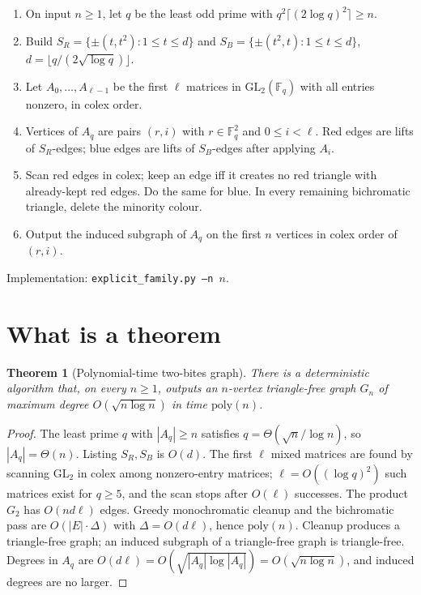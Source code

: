 \documentclass[11pt]{article}
\newtheorem{theorem}{Theorem}
\theoremstyle{definition}
\newcommand{\F}{\mathbb{F}}
\begin{document}
\begin{enumerate}
  \item On input $n\ge 1$, let $q$ be the least odd prime with
        $q^{2}\lceil(2\log q)^{2}\rceil\ge n$.
  \item Build $S_R=\{\pm(t,t^{2}):1\le t\le d\}$ and
        $S_B=\{\pm(t^{2},t):1\le t\le d\}$,
        $d=\lfloor q/(2\sqrt{\log q})\rfloor$.
  \item Let $A_0,\dots,A_{\ell-1}$ be the first $\ell$ matrices in
        $\mathrm{GL}_2(\F_q)$ with all entries nonzero, in colex order.
  \item Vertices of $A_q$ are pairs $(r,i)$ with $r\in\F_q^{2}$ and
        $0\le i<\ell$.
        Red edges are lifts of $S_R$-edges; blue edges are lifts of $S_B$-edges
        after applying $A_i$.
  \item Scan red edges in colex; keep an edge iff it creates no red triangle
        with already-kept red edges. Do the same for blue.
        In every remaining bichromatic triangle, delete the minority colour.
  \item Output the induced subgraph of $A_q$ on the first $n$ vertices in colex
        order of $(r,i)$.
\end{enumerate}

Implementation: \texttt{explicit\_family.py --n $n$}.

\section{What is a theorem}

\begin{theorem}[Polynomial-time two-bites graph]\label{thm:algo}
There is a deterministic algorithm that, on every $n\ge 1$, outputs an
$n$-vertex triangle-free graph $G_n$ of maximum degree
$O(\sqrt{n\log n})$ in time $\mathrm{poly}(n)$.
\end{theorem}

\begin{proof}
The least prime $q$ with $|A_q|\ge n$ satisfies $q=\Theta(\sqrt{n}/\log n)$,
so $|A_q|=\Theta(n)$.
Listing $S_R,S_B$ is $O(d)$.
The first $\ell$ mixed matrices are found by scanning
$\mathrm{GL}_2$ in colex among nonzero-entry matrices; $\ell=O((\log q)^{2})$
such matrices exist for $q\ge 5$, and the scan stops after $O(\ell)$ successes.
The product $G_2$ has $O(nd\ell)$ edges.
Greedy monochromatic cleanup and the bichromatic pass are $O(|E|\cdot\Delta)$
with $\Delta=O(d\ell)$, hence $\mathrm{poly}(n)$.
Cleanup produces a triangle-free graph; an induced subgraph of a triangle-free
graph is triangle-free.
Degrees in $A_q$ are $O(d\ell)=O(\sqrt{|A_q|\log |A_q|})=O(\sqrt{n\log n})$,
and induced degrees are no larger.
\end{proof}
\end{document}
